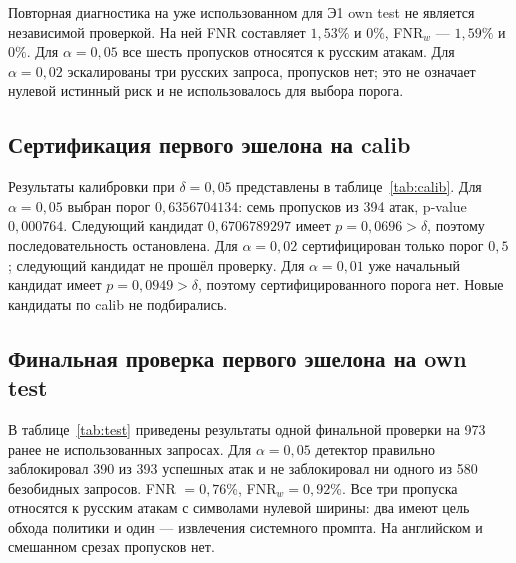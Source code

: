 \documentclass{misisarticle}
\begin{document}
Повторная диагностика на уже использованном для Э1 own test не является независимой проверкой. На ней FNR составляет $1{,}53\%$ и $0\%$, FNR$_w$ --- $1{,}59\%$ и $0\%$. Для $\alpha=0{,}05$ все шесть пропусков относятся к русским атакам. Для $\alpha=0{,}02$ эскалированы три русских запроса, пропусков нет; это не означает нулевой истинный риск и не использовалось для выбора порога.

\subsection{Сертификация первого эшелона на calib}

Результаты калибровки при $\delta=0{,}05$ представлены в таблице~\ref{tab:calib}. Для $\alpha=0{,}05$ выбран порог $0{,}6356704134$: семь пропусков из 394 атак, p-value $0{,}000764$. Следующий кандидат $0{,}6706789297$ имеет $p=0{,}0696>\delta$, поэтому последовательность остановлена. Для $\alpha=0{,}02$ сертифицирован только порог $0{,}5$; следующий кандидат не прошёл проверку. Для $\alpha=0{,}01$ уже начальный кандидат имеет $p=0{,}0949>\delta$, поэтому сертифицированного порога нет. Новые кандидаты по calib не подбирались.

\begin{table}[t]
  \caption{Сертифицированные пороги на own calib}
  \label{tab:calib}
  \centering
\end{table}

\subsection{Финальная проверка первого эшелона на own test}

В таблице~\ref{tab:test} приведены результаты одной финальной проверки на 973 ранее не использованных запросах. Для $\alpha=0{,}05$ детектор правильно заблокировал 390 из 393 успешных атак и не заблокировал ни одного из 580 безобидных запросов. FNR $=0{,}76\%$, FNR$_w=0{,}92\%$. Все три пропуска относятся к русским атакам с символами нулевой ширины: два имеют цель обхода политики и один --- извлечения системного промпта. На английском и смешанном срезах пропусков нет.
\end{document}
